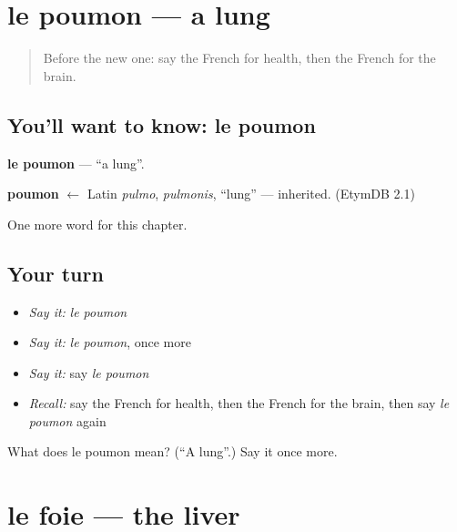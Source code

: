 \section[le poumon]{le poumon — a lung}

\label{lesson:FR-C154-poumon}



\begin{quote}
Before the new one: say the French for health, then the French for the brain.
\end{quote}

\subsection*{You'll want to know: le poumon}
\textbf{le poumon} — \textquotedblleft{}a lung\textquotedblright{}.

\begin{cousinweb}
\textbf{poumon} $\leftarrow$ Latin \emph{pulmo}, \emph{pulmonis}, \textquotedblleft{}lung\textquotedblright{} — inherited. (EtymDB 2.1)
\end{cousinweb}

\begin{grammarlens}[title={What you've built}]
One more word for this chapter.
\end{grammarlens}

\subsection*{Your turn}
\begin{itemize}
\raggedright
  \item \emph{Say it:} \emph{le poumon}
  \item \emph{Say it:} \emph{le poumon}, once more
  \item \emph{Say it:} say \emph{le poumon}
  \item \emph{Recall:} say the French for health, then the French for the brain, then say \emph{le poumon} again
\end{itemize}

\begin{tcolorbox}[breakable,colback=teal!4,colframe=teal!35!black,title={Before you move on}]
What does le poumon mean? (\textquotedblleft{}A lung\textquotedblright{}.) Say it once more.
\end{tcolorbox}
\section[le foie]{le foie — the liver}

